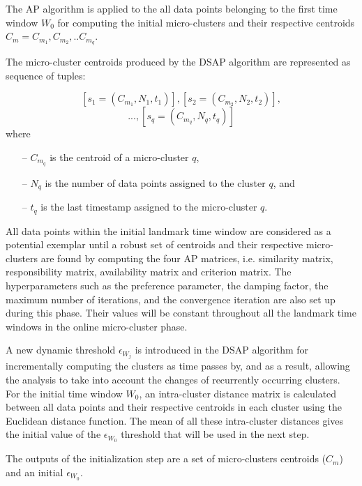 The AP algorithm is applied to the all data points belonging to the first time window $W_0$ for computing the initial micro-clusters and their respective centroids $C_m = C_{m_1}, C_{m_2},..C_{m_q}$. 

The micro-cluster centroids produced by the DSAP algorithm are represented as sequence of tuples:
    
    \[    \left [  s_{1} =\left ( C_{m_1},N_{1},t_{1} \right )  \right ], \left [ s_{2} = \left ( C_{m_2},N_{2}, t_{2} \right ) \right ],\]
    \[...,\left [ s_q = \left ( C_{m_q}, N_q, t_{q} \right ) \right ] \]  
    where
    \begin{itemize}
        \item[--] $C_{m_q}$ is the centroid of a micro-cluster $q$,
        \item[--] $N_q$ is the number of data points assigned to the cluster $q$, and
        \item[--] $t_{q}$ is the last timestamp assigned to the micro-cluster $q$.
    \end{itemize}

All data points within the initial landmark time window are considered as a potential exemplar until a robust set of centroids and their respective micro-clusters are found by computing the four AP matrices, i.e. similarity matrix, responsibility matrix, availability matrix and criterion matrix. The hyperparameters such as the preference parameter, the damping factor, the maximum number of iterations, and the convergence iteration are also set up during this phase. Their values will be constant throughout all the landmark time windows in the online micro-cluster phase.

A new dynamic threshold $\epsilon_{W_j}$ is introduced in the DSAP algorithm for incrementally computing the clusters as time passes by, and as a result, allowing the analysis to take into account the changes of recurrently occurring clusters. For the initial time window $W_0$, an intra-cluster distance matrix is calculated between all data points and their respective centroids in each cluster using the Euclidean distance function. The mean of all these intra-cluster distances gives the initial value of the $\epsilon_{W_0}$ threshold that will be used in the next step.

The outputs of the initialization step are a set of micro-clusters centroids ($C_m$) and an initial $\epsilon_{W_0}$.


   
    
    

